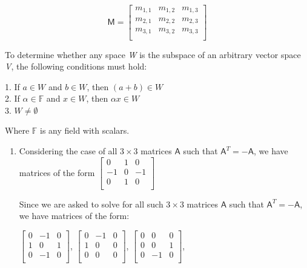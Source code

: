\documentclass[a4paper, 11pt]{article}
\newcommand{\mat}[1]{\boldsymbol { \mathsf{#1}} }
\begin{document}
\begin{enumerate}
\begin{equation*}
    \mat{M} = 
    \begin{bmatrix}
    m_{1,1} & m_{1,2} & m_{1,3} \\
    m_{2,1} & m_{2,2} & m_{2,3} \\
    m_{3,1} & m_{3,2} & m_{3,3} \\
    \end{bmatrix}
\end{equation*}

To determine whether any space \textit{W} is the subspace of an arbitrary vector space \textit{V}, the following conditions must hold:


    1. If $a \in W$ and $b \in W$, then $(a+b) \in W$ \\
    2. If $\alpha \in \mathbb{F}$ and $x \in W$, then $\alpha x \in W$ \\
    3. $W \neq \emptyset$

Where $\mathbb{F}$ is any field with scalars.\cite{SubSpaces}

\begin{enumerate}[label=(\alph*)]
\item Considering the case of all $3 \times 3$ matrices $\mat A$ such that $\mat A^T = -\mat A$, we have matrices of the form $\begin{bmatrix}
0 & 1 & 0 \\
-1 & 0 & -1 \\
0 & 1 & 0 \\
\end{bmatrix}$

Since we are asked to solve for all such $3 \times 3$ matrices $\mat{A}$ such that $\mat A^T = -\mat A$, we have matrices of the form:
    \begin{center}
    $\begin{bmatrix}
    0 & -1 & 0 \\
    1 & 0 & 1 \\
    0 & -1 & 0 \\
    \end{bmatrix}$,
    $\begin{bmatrix}
    0 & -1 & 0 \\
    1 & 0 & 0 \\
    0 & 0 & 0 \\
    \end{bmatrix}$,
        $\begin{bmatrix}
    0 & 0 & 0 \\
    0 & 0 & 1 \\
    0 & -1 & 0 \\
    \end{bmatrix}$,
        \end{center}
    

\end{enumerate}
\end{enumerate}
\end{document}
